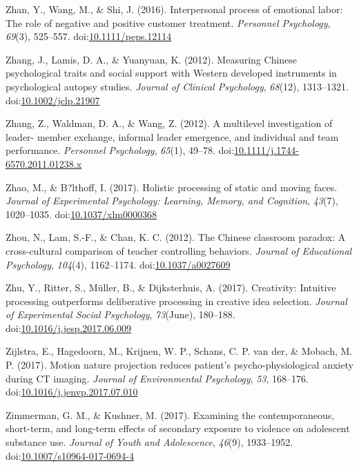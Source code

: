 \documentclass[english,man]{apa6}
\begin{document}
\hypertarget{ref-Zhan2016}{}
Zhan, Y., Wang, M., \& Shi, J. (2016). Interpersonal process of
emotional labor: The role of negative and positive customer treatment.
\emph{Personnel Psychology}, \emph{69}(3), 525--557.
doi:\href{https://doi.org/10.1111/peps.12114}{10.1111/peps.12114}

\hypertarget{ref-Zhang2012a}{}
Zhang, J., Lamis, D. A., \& Yuanyuan, K. (2012). Measuring Chinese
psychological traits and social support with Western developed
instruments in psychological autopsy studies. \emph{Journal of Clinical
Psychology}, \emph{68}(12), 1313--1321.
doi:\href{https://doi.org/10.1002/jclp.21907}{10.1002/jclp.21907}

\hypertarget{ref-Zhang2012}{}
Zhang, Z., Waldman, D. A., \& Wang, Z. (2012). A multilevel
investigation of leader- member exchange, informal leader emergence, and
individual and team performance. \emph{Personnel Psychology},
\emph{65}(1), 49--78.
doi:\href{https://doi.org/10.1111/j.1744-6570.2011.01238.x}{10.1111/j.1744-6570.2011.01238.x}

\hypertarget{ref-Zhao2017}{}
Zhao, M., \& B?lthoff, I. (2017). Holistic processing of static and
moving faces. \emph{Journal of Experimental Psychology: Learning,
Memory, and Cognition}, \emph{43}(7), 1020--1035.
doi:\href{https://doi.org/10.1037/xlm0000368}{10.1037/xlm0000368}

\hypertarget{ref-Zhou2012}{}
Zhou, N., Lam, S.-F., \& Chan, K. C. (2012). The Chinese classroom
paradox: A cross-cultural comparison of teacher controlling behaviors.
\emph{Journal of Educational Psychology}, \emph{104}(4), 1162--1174.
doi:\href{https://doi.org/10.1037/a0027609}{10.1037/a0027609}

\hypertarget{ref-Zhu2017}{}
Zhu, Y., Ritter, S., Müller, B., \& Dijksterhuis, A. (2017). Creativity:
Intuitive processing outperforms deliberative processing in creative
idea selection. \emph{Journal of Experimental Social Psychology},
\emph{73}(June), 180--188.
doi:\href{https://doi.org/10.1016/j.jesp.2017.06.009}{10.1016/j.jesp.2017.06.009}

\hypertarget{ref-Zijlstra2017}{}
Zijlstra, E., Hagedoorn, M., Krijnen, W. P., Schans, C. P. van der, \&
Mobach, M. P. (2017). Motion nature projection reduces patient's
psycho-physiological anxiety during CT imaging. \emph{Journal of
Environmental Psychology}, \emph{53}, 168--176.
doi:\href{https://doi.org/10.1016/j.jenvp.2017.07.010}{10.1016/j.jenvp.2017.07.010}

\hypertarget{ref-Zimmerman2017}{}
Zimmerman, G. M., \& Kushner, M. (2017). Examining the contemporaneous,
short-term, and long-term effects of secondary exposure to violence on
adolescent substance use. \emph{Journal of Youth and Adolescence},
\emph{46}(9), 1933--1952.
doi:\href{https://doi.org/10.1007/s10964-017-0694-4}{10.1007/s10964-017-0694-4}
\end{document}
